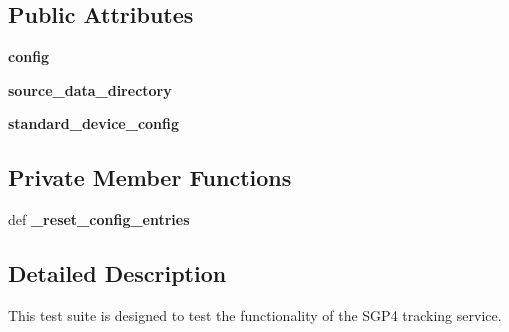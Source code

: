 \subsection*{Public Attributes}
\begin{DoxyCompactItemize}
\item 
\hypertarget{classhwm_1_1hardware_1_1devices_1_1drivers_1_1sgp4__tracker_1_1tests_1_1test__sgp4__tracker_1_1_test_s_g_p4_tracking_service_a0bdc50a5bcf675cb735b7c06dca15d02}{{\bfseries config}}\label{classhwm_1_1hardware_1_1devices_1_1drivers_1_1sgp4__tracker_1_1tests_1_1test__sgp4__tracker_1_1_test_s_g_p4_tracking_service_a0bdc50a5bcf675cb735b7c06dca15d02}

\item 
\hypertarget{classhwm_1_1hardware_1_1devices_1_1drivers_1_1sgp4__tracker_1_1tests_1_1test__sgp4__tracker_1_1_test_s_g_p4_tracking_service_a7bffb893766c47e6fbc09d195158cdfb}{{\bfseries source\-\_\-data\-\_\-directory}}\label{classhwm_1_1hardware_1_1devices_1_1drivers_1_1sgp4__tracker_1_1tests_1_1test__sgp4__tracker_1_1_test_s_g_p4_tracking_service_a7bffb893766c47e6fbc09d195158cdfb}

\item 
\hypertarget{classhwm_1_1hardware_1_1devices_1_1drivers_1_1sgp4__tracker_1_1tests_1_1test__sgp4__tracker_1_1_test_s_g_p4_tracking_service_a403cc5e318f513456ef59f869c87896f}{{\bfseries standard\-\_\-device\-\_\-config}}\label{classhwm_1_1hardware_1_1devices_1_1drivers_1_1sgp4__tracker_1_1tests_1_1test__sgp4__tracker_1_1_test_s_g_p4_tracking_service_a403cc5e318f513456ef59f869c87896f}

\end{DoxyCompactItemize}
\subsection*{Private Member Functions}
\begin{DoxyCompactItemize}
\item 
\hypertarget{classhwm_1_1hardware_1_1devices_1_1drivers_1_1sgp4__tracker_1_1tests_1_1test__sgp4__tracker_1_1_test_s_g_p4_tracking_service_abb638be66879a8904fe639186e858234}{def {\bfseries \-\_\-reset\-\_\-config\-\_\-entries}}\label{classhwm_1_1hardware_1_1devices_1_1drivers_1_1sgp4__tracker_1_1tests_1_1test__sgp4__tracker_1_1_test_s_g_p4_tracking_service_abb638be66879a8904fe639186e858234}

\end{DoxyCompactItemize}


\subsection{Detailed Description}
This test suite is designed to test the functionality of the S\-G\-P4 tracking service. 

